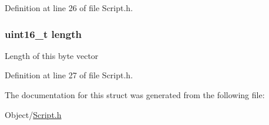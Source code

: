 Definition at line 26 of file Script.h.

\hypertarget{struct_m_i_script_byte_vector_a1892eba2086d12ac2b09005aeb09ea3b}{
\subsubsection[{length}]{\setlength{\rightskip}{0pt plus 5cm}uint16\_\-t {\bf length}}}
\label{struct_m_i_script_byte_vector_a1892eba2086d12ac2b09005aeb09ea3b}
Length of this byte vector 

Definition at line 27 of file Script.h.



The documentation for this struct was generated from the following file:\begin{DoxyCompactItemize}
\item 
Object/\hyperlink{_m_i_script_8h}{Script.h}\end{DoxyCompactItemize}
